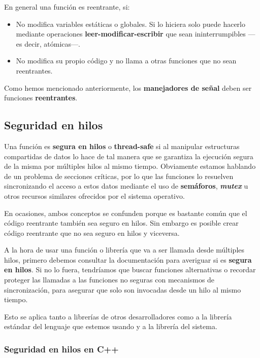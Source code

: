 En general una función es reentrante, si:

\begin{itemize}
\item
  No modifica variables estáticas o globales. Si lo hiciera solo puede
  hacerlo mediante operaciones \textbf{leer-modificar-escribir} que sean
  ininterrumpibles ---es decir, atómicas---.
\item
  No modifica su propio código y no llama a otras funciones que no sean
  reentrantes.
\end{itemize}

Como hemos mencionado anteriormente, los \textbf{manejadores de señal}
deben ser funciones \textbf{reentrantes}.

\subsection{Seguridad en hilos}\label{_seguridad_en_hilos}

{} {} Una función es \textbf{segura en hilos} o \textbf{{}thread-safe}
si al manipular estructuras compartidas de datos lo hace de tal manera
que se garantiza la ejecución segura de la misma por múltiples hilos al
mismo tiempo. Obviamente estamos hablando de un problema de secciones
críticas, por lo que las funciones lo resuelven sincronizando el acceso
a estos datos mediante el uso de \textbf{semáforos},
\textbf{\emph{mutex}} u otros recursos similares ofrecidos por el
sistema operativo.

En ocasiones, ambos conceptos se confunden porque es bastante común que
el código reentrante también sea seguro en hilos. Sin embargo es posible
crear código reentrante que no sea seguro en hilos y viceversa.

A la hora de usar una función o librería que va a ser llamada desde
múltiples hilos, primero debemos consultar la documentación para
averiguar si es \textbf{segura en hilos}. Si no lo fuera, tendríamos que
buscar funciones alternativas o recordar proteger las llamadas a las
funciones no seguras con mecanismos de sincronización, para asegurar que
solo son invocadas desde un hilo al mismo tiempo.

Esto se aplica tanto a librerías de otros desarrolladores como a la
librería estándar del lenguaje que estemos usando y a la librería del
sistema.

\subsubsection{Seguridad en hilos en
C++}\label{_seguridad_en_hilos_en_c}

